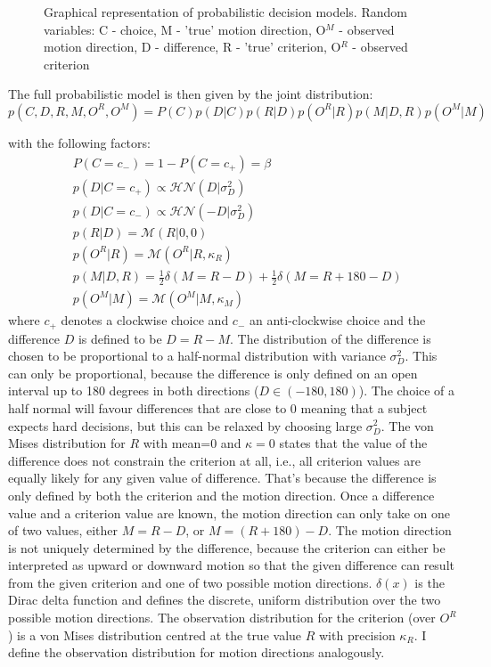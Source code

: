 \documentclass[10pt,a4paper]{article}
\begin{document}
\begin{figure}
    \centering
    \def\svgwidth{.5\columnwidth}
    
    \caption{Graphical representation of probabilistic decision models. Random variables: C - choice, M - 'true' motion direction, O$^M$ - observed motion direction, D - difference, R - 'true' criterion, O$^R$ - observed criterion}
    \label{fig:graphic_models}
\end{figure}

The full probabilistic model is then given by the joint distribution:
\begin{equation}\label{eq:joint_diff}
p(C, D, R, M, O^R, O^M) = P(C)p(D | C)p(R | D)p(O^R | R)p(M | D, R)p(O^M | M)
\end{equation}

with the following factors:
\begin{align}
&P(C = c_-) = 1 - P(C = c_+) = \beta\\
&p(D | C=c_+) \propto \mathcal{HN}(D | \sigma_D^2)\\
&p(D | C=c_-) \propto \mathcal{HN}(-D | \sigma_D^2)\\
&p(R | D) = \mathcal{M}(R | 0, 0)\\
&p(O^R | R) = \mathcal{M}(O^R | R, \kappa_{R})\\
&p(M | D, R) = \frac{1}{2}\delta(M = R - D) + \frac{1}{2}\delta(M = R + 180 - D)\\
&p(O^M | M) = \mathcal{M}(O^M | M, \kappa_{M})
\end{align}
where $c_+$ denotes a clockwise choice and $c_-$ an anti-clockwise choice and the difference $D$ is defined to be $D = R - M$. The distribution of the difference is chosen to be proportional to a half-normal distribution with variance $\sigma_D^2$. This can only be proportional, because the difference is only defined on an open interval up to 180 degrees in both directions ($D \in (-180, 180)$). The choice of a half normal will favour differences that are close to 0 meaning that a subject expects hard decisions, but this can be relaxed by choosing large $\sigma_D^2$. The von Mises distribution for $R$ with mean=0 and $\kappa=0$ states that the value of the difference does not constrain the criterion at all, i.e., all criterion values are equally likely for any given value of difference. That's because the difference is only defined by both the criterion and the motion direction. Once a difference value and a criterion value are known, the motion direction can only take on one of two values, either $M = R - D$, or $M = (R + 180) - D$. The motion direction is not uniquely determined by the difference, because the criterion can either be interpreted as upward or downward motion so that the given difference can result from the given criterion and one of two possible motion directions. $\delta(x)$ is the Dirac delta function and defines the discrete, uniform distribution over the two possible motion directions. The observation distribution for the criterion (over $O^R$) is a von Mises distribution centred at the true value $R$ with precision $\kappa_R$. I define the observation distribution for motion directions analogously.
\end{document}
